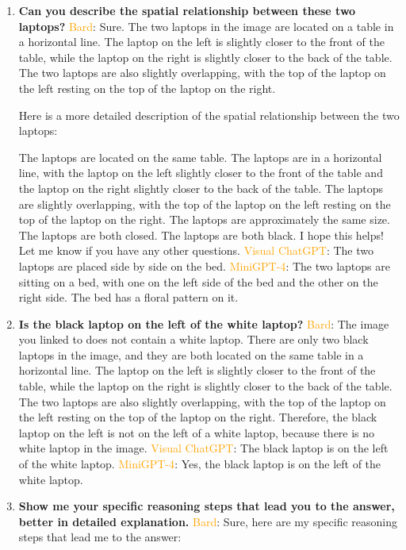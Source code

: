     \begin{enumerate}
        \item \textbf{Can you describe the spatial relationship between these two laptops?}
        \subitem \textcolor{orange}{Bard}:
        Sure. The two laptops in the image are located on a table in a horizontal line. The laptop on the left is slightly closer to the front of the table, while the laptop on the right is slightly closer to the back of the table. The two laptops are also slightly overlapping, with the top of the laptop on the left resting on the top of the laptop on the right.

        Here is a more detailed description of the spatial relationship between the two laptops:

        The laptops are located on the same table.
        The laptops are in a horizontal line, with the laptop on the left slightly closer to the front of the table and the laptop on the right slightly closer to the back of the table.
        The laptops are slightly overlapping, with the top of the laptop on the left resting on the top of the laptop on the right.
        The laptops are approximately the same size.
        The laptops are both closed.
        The laptops are both black.
        I hope this helps! Let me know if you have any other questions.
        \subitem \textcolor{orange}{Visual ChatGPT}: The two laptops are placed side by side on the bed.
        \subitem \textcolor{orange}{MiniGPT-4}: The two laptops are sitting on a bed, with one on the left side of the bed and the other on the right side. The bed has a floral pattern on it.

        \item \textbf{Is the black laptop on the left of the white laptop?}
        \subitem \textcolor{orange}{Bard}: The image you linked to does not contain a white laptop. There are only two black laptops in the image, and they are both located on the same table in a horizontal line. The laptop on the left is slightly closer to the front of the table, while the laptop on the right is slightly closer to the back of the table. The two laptops are also slightly overlapping, with the top of the laptop on the left resting on the top of the laptop on the right.
        Therefore, the black laptop on the left is not on the left of a white laptop, because there is no white laptop in the image.
        \subitem \textcolor{orange}{Visual ChatGPT}: The black laptop is on the left of the white laptop.
        \subitem \textcolor{orange}{MiniGPT-4}: Yes, the black laptop is on the left of the white laptop.
        \item \textbf{Show me your specific reasoning steps that lead you to the answer, better in detailed explanation.}
        \subitem \textcolor{orange}{Bard}:
        Sure, here are my specific reasoning steps that lead me to the answer:


\end{enumerate}
